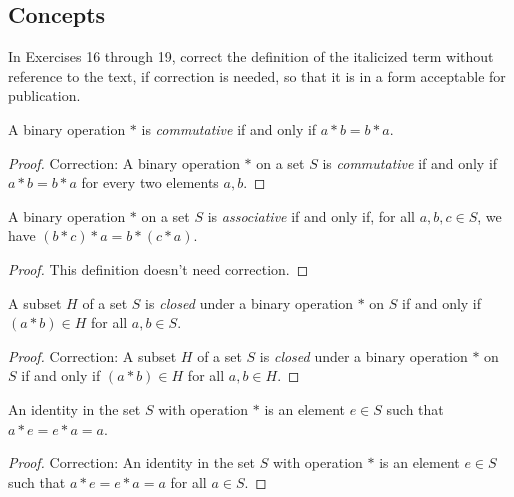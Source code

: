 \subsection*{Concepts}

In Exercises 16 through 19, correct the definition of the italicized term without reference to the text, if correction is needed, so that it is in a form acceptable for publication.

\begin{exercise}
    A binary operation $*$ is \textit{commutative} if and only if $a * b = b * a$.
\end{exercise}

\begin{proof}
    Correction: A binary operation $*$ on a set $S$ is \textit{commutative} if and only if $a * b = b * a$ for every two elements $a, b$.
\end{proof}

\begin{exercise}
    A binary operation $*$ on a set $S$ is \textit{associative} if and only if, for all $a, b, c\in S$, we have $(b * c) * a = b * (c * a)$.
\end{exercise}

\begin{proof}
    This definition doesn't need correction.
\end{proof}

\begin{exercise}
    A subset $H$ of a set $S$ is \textit{closed} under a binary operation $*$ on $S$ if and only if $(a * b)\in H$ for all $a, b\in S$.
\end{exercise}

\begin{proof}
    Correction: A subset $H$ of a set $S$ is \textit{closed} under a binary operation $*$ on $S$ if and only if $(a * b)\in H$ for all $a, b\in H$.
\end{proof}

\begin{exercise}
    An identity in the set $S$ with operation $*$ is an element $e\in S$ such that $a * e = e * a = a$.
\end{exercise}

\begin{proof}
    Correction: An identity in the set $S$ with operation $*$ is an element $e\in S$ such that $a * e = e * a = a$ for all $a\in S$.
\end{proof}


